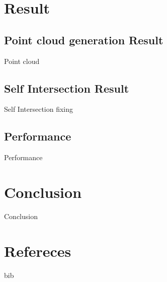 \documentclass[10pt]{beamer}
\begin{document}
\section{Result}
\subsection{Point cloud generation Result}
\begin{frame}{Point cloud}
    
\end{frame}

\subsection{Self Intersection Result}
\begin{frame}{Self Intersection fixing}
    
\end{frame}

\subsection{Performance}
\begin{frame}{Performance}
    
\end{frame}

\section{Conclusion}
\begin{frame}{Conclusion}
    
\end{frame}

\section{Refereces}
\begin{frame}{bib}
    
\end{frame}
\end{document}
